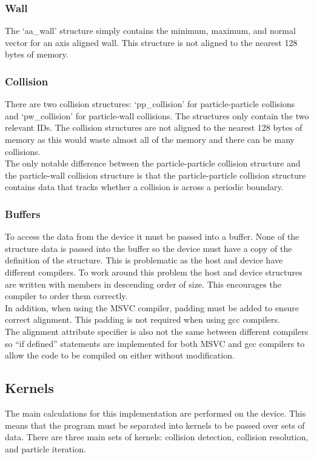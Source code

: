 \documentclass[10pt,a4paper,titlepage]{report}
\begin{document}
\subsubsection{Wall}
The `aa\_wall' structure simply contains the minimum, maximum, and normal vector for an axis aligned wall. This structure is not aligned to the nearest 128 bytes of memory.
\subsubsection{Collision}
There are two collision structures: `pp\_collision' for particle-particle collisions and `pw\_collision' for particle-wall collisions. The structures only contain the two relevant IDs. The collision structures are not aligned to the nearest 128 bytes of memory as this would waste almost all of the memory and there can be many collisions.
\\The only notable difference between the particle-particle collision structure and the particle-wall collision structure is that the particle-particle collision structure contains data that tracks whether a collision is across a periodic boundary.
\subsubsection{Buffers}
To access the data from the device it must be passed into a buffer. None of the structure data is passed into the buffer so the device must have a copy of the definition of the structure. This is problematic as the host and device have different compilers. To work around this problem the host and device structures are written with members in descending order of size. This encourages the compiler to order them correctly.
\\In addition, when using the MSVC compiler, padding must be added to ensure correct alignment. This padding is not required when using gcc compilers. 
\\The alignment attribute specifier is also not the same between different compilers so ``if defined'' statements are implemented for both MSVC and gcc compilers to allow the code to be compiled on either without modification.
\subsection{Kernels}
The main calculations for this implementation are performed on the device. This means that the program must be separated into kernels to be passed over sets of data. There are three main sets of kernels: collision detection, collision resolution, and particle iteration.
\end{document}
